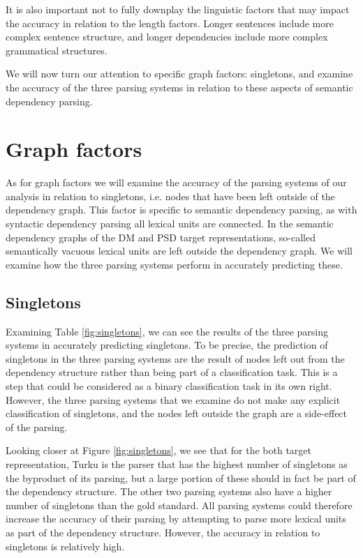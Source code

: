It is also important not to fully downplay the linguistic factors that may impact the accuracy in relation to the length factors. Longer sentences include more complex sentence structure, and longer dependencies include more complex grammatical structures.

We will now turn our attention to specific graph factors: singletons, and examine the accuracy of the three parsing systems in relation to these aspects of semantic dependency parsing.













\section{Graph factors}

As for graph factors we will examine the accuracy of the parsing systems of our analysis in relation to singletons, i.e. nodes that have been left outside of the dependency graph. This factor is specific to semantic dependency parsing, as with syntactic dependency parsing all lexical units are connected. In the semantic dependency graphs of the DM and PSD target representations, so-called semantically vacuous lexical units are left outside the dependency graph. We will examine how the three parsing systems perform in accurately predicting these.

\subsection{Singletons}

Examining Table \ref{fig:singletons}, we can see the results of the three parsing systems in accurately predicting singletons. To be precise, the prediction of singletons in the three parsing systems are the result of nodes left out from the dependency structure rather than being part of a classification task. This is a step that could be considered as a binary classification task in its own right. However, the three parsing systems that we examine do not make any explicit classification of singletons, and the nodes left outside the graph are a side-effect of the parsing.

Looking closer at Figure \ref{fig:singletons}, we see that for the both target representation, Turku is the parser that has the highest number of singletons as the byproduct of its parsing, but a large portion of these should in fact be part of the dependency structure. The other two parsing systems also have a higher number of singletons than the gold standard. All parsing systems could therefore increase the accuracy of their parsing by attempting to parse more lexical units as part of the dependency structure. However, the accuracy in relation to singletons is relatively high.

